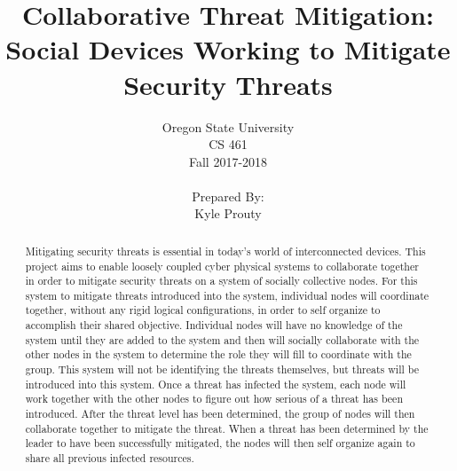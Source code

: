 \documentclass[draftclsnofoot, onecolumn, 10pt]{IEEEtran}
\title{\huge Collaborative Threat Mitigation: \\Social Devices Working to Mitigate Security Threats}
\author{Oregon State University\\CS 461\\Fall 2017-2018\\\\Prepared By:\\Kyle Prouty}
\begin{document}
\begin{titlingpage}
    \maketitle 
    \begin{abstract}
		\noindent 
Mitigating security threats is essential in today's world of interconnected devices. This project aims to enable loosely coupled cyber physical systems to collaborate together in order to mitigate security threats on a system of socially collective nodes. For this system to mitigate threats introduced into the system, individual nodes will coordinate together, without any rigid logical configurations, in order to self organize to accomplish their shared objective. Individual nodes will have no knowledge of the system until they are added to the system and then will socially collaborate with the other nodes in the system to determine the role they will fill to coordinate with the group. This system will not be identifying the threats themselves, but threats will be introduced into this system. Once a threat has infected the system, each node will work together with the other nodes to figure out how serious of a threat has been introduced. After the threat level has been determined, the group of nodes will then collaborate together to mitigate the threat. When a threat has been determined by the leader to have been successfully mitigated, the nodes will then self organize again to share all previous infected resources.
    
    \end{abstract}
\end{titlingpage}
\end{document}
